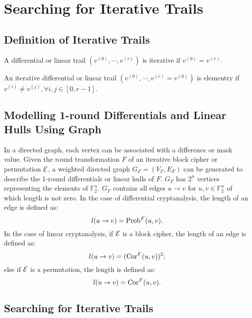 \section{Searching for Iterative Trails}

\subsection{Definition of Iterative Trails}

\begin{definition}
	A differential or linear trail $(v^{(0)},\cdots,v^{(r)})$ is iterative if $v^{(0)}=v^{(r)}$.
\end{definition}

\begin{definition}
    An iterative differential or linear trail $(v^{(0)},\cdots,v^{(r)}=v^{(0)})$ is elementry if $v^{(i)}\neq v^{(j)},\forall i,j\in [0,r-1]$.
\end{definition}

\subsection{Modelling 1-round Differentials and Linear Hulls Using Graph}

In a directed graph, each vertex can be associated with a difference or mask value. Given the round transformation $F$ of an iterative block cipher or permutation $\mathcal{E}$, a weighted directed graph $G_{F}=(V_{F},E_{F})$ can be generated to describe the 1-round differentials or linear hulls of $F$. $G_{F}$ has $2^n$ vertices representing the elements of $\mathbb{F}_2^n$. $G_{F}$ contains all edges $u\rightarrow v$ for $u,v\in \mathbb{F}_2^n$ of which length is not zero. In the case of differential cryptanalysis, the length of an edge is defined as:
\[
    l(u\rightarrow v)=\text{Prob}^{F}(u,v).
\]
In the case of linear cryptanalysis, if $\mathcal{E}$ is a block cipher, the length of an edge is defined as:
\[
    l(u\rightarrow v)=(\text{Cor}^{F}(u,v))^2;
\]
else if $\mathcal{E}$ is a permutation, the length is defined as:
\[
    l(u\rightarrow v)=\text{Cor}^{F}(u,v).
\]

\subsection{Searching for Iterative Trails}


